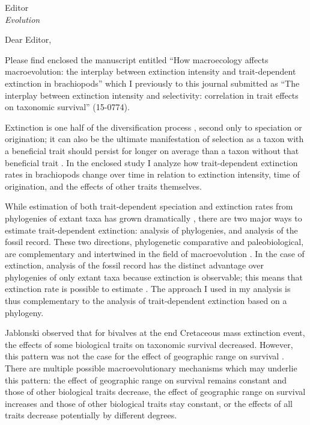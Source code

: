 \documentclass{letter}
\begin{document}
\begin{letter}{Editor \\ \textit{Evolution}}
  \opening{Dear Editor,}

  Please find enclosed the manuscript entitled ``How macroecology affects macroevolution: the interplay between extinction intensity and trait-dependent extinction in brachiopods'' which I previously to this journal submitted as ``The interplay between extinction intensity and selectivity: correlation in trait effects on taxonomic survival'' (15-0774).
  
  Extinction is one half of the diversification process \cite{Raup1994,Stanley1979,Stanley1975}, second only to speciation or origination; it can also be the ultimate manifestation of selection as a taxon with a beneficial trait should persist for longer on average than a taxon without that beneficial trait \cite{Rabosky2010b,Jablonski2008a,Raup1994,Stanley1975}. In the enclosed study I analyze how trait-dependent extinction rates in brachiopods change over time in relation to extinction intensity, time of origination, and the effects of other traits themselves.

  While estimation of both trait-dependent speciation and extinction rates from phylogenies of extant taxa has grown dramatically \cite{Maddison2007,Fitzjohn2010,Goldberg2011a,Goldberg2005,Rabosky2013,Stadler2013b,Stadler2011a,Stadler2013a}, there are two major ways to estimate trait-dependent extinction: analysis of phylogenies, and analysis of the fossil record. These two directions, phylogenetic comparative and paleobiological, are complementary and intertwined in the field of macroevolution \cite{Rabosky2010b,Jablonski2008a,Hunt2014a}. In the case of extinction, analysis of the fossil record has the distinct advantage over phylogenies of only extant taxa because extinction is observable; this means that extinction rate is possible to estimate \cite{Rabosky2010a,Quental2009,Liow2010a}. The approach I used in my analysis is thus complementary to the analysis of trait-dependent extinction based on a phylogeny.

  Jablonski \cite{Jablonski1986} observed that for bivalves at the end Cretaceous mass extinction event, the effects of some biological traits on taxonomic survival decreased. However, this pattern was not the case for the effect of geographic range on survival \cite{Jablonski1986,Payne2007}. There are multiple possible macroevolutionary mechanisms which may underlie this pattern: the effect of geographic range on survival remains constant and those of other biological traits decrease, the effect of geographic range on survival increases and those of other biological traits stay constant, or the effects of all traits decrease potentially by different degrees.


\end{letter}
\end{document}
